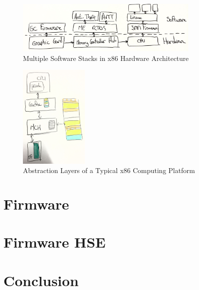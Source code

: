 \begin{figure}
  \centering
  \includegraphics[width=0.8\textwidth]{Figures/intro-computing-platform.jpg}
  \caption{Multiple Software Stacks in x86 Hardware Architecture}
  \label{fig:usecase:computing-platform}
\end{figure}

\begin{figure}
  \centering
  \includegraphics[width=0.3\textwidth]{Figures/computing-platform-3.jpg}
  \caption{Abstraction Layers of a Typical x86 Computing Platform}
  \label{fig:usecase:computing-platform}
\end{figure}

\section{Firmware}
\label{sec:usecase:firmware}

\section{Firmware HSE}
\label{sec:usecase:hse}

\section{Conclusion}
\label{sec:usecase:conclusion}
